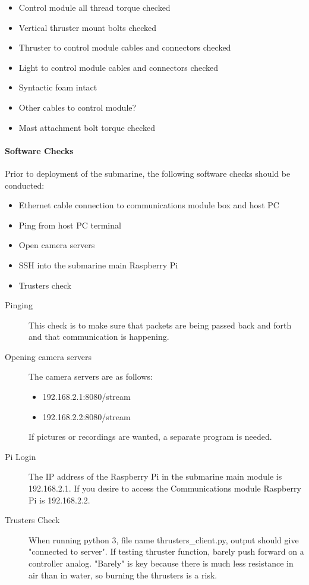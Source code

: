 \documentclass[
18pt, %
a4paper, %
oneside, %
headinclude,footinclude, %
]{scrartcl}
\begin{document}
\begin{itemize}[noitemsep] %
	\item Control module all thread torque checked
	\item Vertical thruster mount bolts checked
	\item Thruster to control module cables and connectors checked
	\item Light to control module cables and connectors checked
	\item Syntactic foam intact
	\item Other cables to control module?
	\item Mast attachment bolt torque checked
\end{itemize}

\paragraph{Software Checks} Prior to deployment of the submarine, the following software checks should be conducted:

\begin{itemize}[noitemsep] %
	\item Ethernet cable connection to communications module box and host PC
	\item Ping from host PC terminal
	\item Open camera servers
	\item SSH into the submarine main Raspberry Pi
	\item Trusters check
\end{itemize}

\begin{description}
	\item[Pinging] 
	This check is to make sure that packets are being passed back and forth and that communication is happening.
	\item[Opening camera servers] 
	The camera servers are as follows:
	 
	\begin{itemize}[noitemsep]
		\item 192.168.2.1:8080/stream
		\item 192.168.2.2:8080/stream
	\end{itemize}

	If pictures or recordings are wanted, a separate program is needed.
	\item[Pi Login]
	The IP address of the Raspberry Pi in the submarine main module is 192.168.2.1. If you desire to access the Communications module Raspberry Pi is 192.168.2.2.
	\item[Trusters Check] When running python 3, file name thrusters\_client.py, output should give "connected to server". If testing thruster function, barely push forward on a controller analog. "Barely" is key because there is much less resistance in air than in water, so burning the thrusters is a risk.
\end{description}
\end{document}
